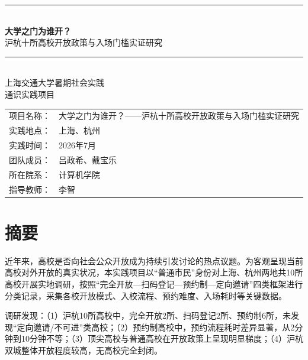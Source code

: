 \documentclass[12pt]{article}
\begin{document}
\begin{titlepage}
\centering
\vspace*{1cm}

\rule{0.8\textwidth}{0.4pt}\\[1.5cm]
{\Huge\bfseries\color{shanghaiBlue} 大学之门为谁开？}\\[0.5cm]
{\LARGE 沪杭十所高校开放政策与入场门槛实证研究}\\[1.2cm]

\rule{0.8\textwidth}{0.4pt}\\[0.8cm]

{\Large 上海交通大学暑期社会实践}\\[0.5cm]
{\large 通识实践项目}\\[2cm]

\begin{tabular}{rl}
项目名称： & 大学之门为谁开？——沪杭十所高校开放政策与入场门槛实证研究\\
实践地点： & 上海、杭州 \\
实践时间： & 2026年7月 \\
团队成员： & 吕政希、戴宝乐 \\
所在院系： & 计算机学院 \\
指导教师： & 李智\\
\end{tabular}

\vfill

\end{titlepage}

\newpage
\section*{摘要}

近年来，高校是否向社会公众开放成为持续引发讨论的热点议题。为客观呈现当前高校对外开放的真实状况，本实践项目以“普通市民”身份对上海、杭州两地共10所高校开展实地调研，按照“完全开放—扫码登记—预约制—定向邀请”四类框架进行分类记录，采集各校开放模式、入校流程、预约难度、入场耗时等关键数据。

调研发现：（1）沪杭10所高校中，完全开放2所、扫码登记2所、预约制6所，未发现“定向邀请/不可进”类高校；（2）预约制高校中，预约流程耗时差异显著，从2分钟到10分钟不等；（3）顶尖高校与普通高校在开放政策上呈现明显梯度；（4）沪杭双城整体开放程度较高，无高校完全封闭。
\end{document}

